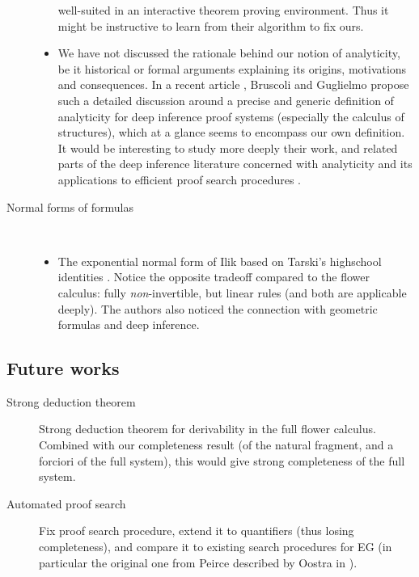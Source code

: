 \begin{procedure}[H]
\begin{description}
\begin{itemize}
      well-suited in an interactive theorem proving environment. Thus it might
      be instructive to learn from their algorithm to fix ours.
      \item We have not discussed the rationale behind our notion of
      analyticity, be it historical or formal arguments explaining its origins,
      motivations and consequences. In a recent article
      , Bruscoli and Guglielmo propose such
      a detailed discussion around a precise and generic definition of
      analyticity for deep inference proof systems (especially the calculus of
      structures), which at a glance seems to encompass our own definition. It
      would be interesting to study more deeply their work, and related parts of
      the deep inference literature concerned with analyticity and its
      applications to efficient proof search procedures
      .
    \end{itemize}
  \item[Normal forms of formulas]~\\
    \begin{itemize}
      \item The exponential normal form of Ilik based on Tarski's highschool
  identities . Notice the opposite
  tradeoff compared to the flower calculus: fully \emph{non}-invertible, but
  linear rules (and both are applicable deeply). The authors also noticed the
  connection with geometric formulas and deep inference.
    \end{itemize} 
\end{description}

\subsection{Future works}

\begin{description}
  \item[Strong deduction theorem] Strong deduction theorem for derivability in
  the full flower calculus. Combined with our completeness result (of the
  natural fragment, and a forciori of the full system), this would give strong
  completeness of the full system.

  \item[Automated proof search] Fix proof search procedure, extend it to
  quantifiers (thus losing completeness), and compare it to existing search
  procedures for EG (in particular the original one from Peirce described by
  Oostra in \cite{oostra_advances_2022}).


\end{description}
\end{procedure}

